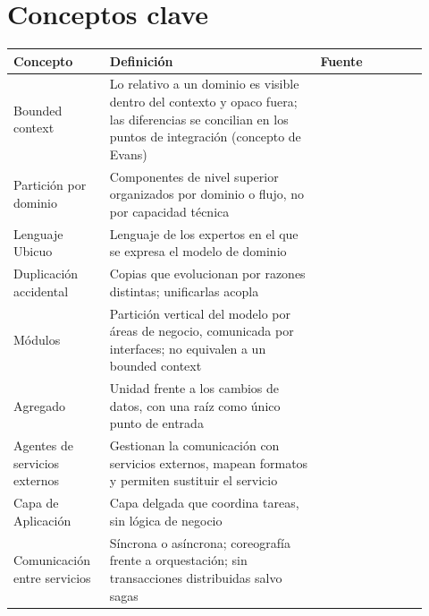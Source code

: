 \section{Conceptos clave}

\begin{table}[htbp]
  \centering
  \footnotesize
  \renewcommand{\arraystretch}{1.2}
  \begin{tabular}{@{}p{0.21\linewidth}p{0.47\linewidth}p{0.24\linewidth}@{}}
    \toprule
    \textbf{Concepto} & \textbf{Definición} & \textbf{Fuente} \\
    \midrule
    \raggedright Bounded context
      & \raggedright Lo relativo a un dominio es visible dentro del contexto y opaco fuera; las
        diferencias se concilian en los puntos de integración (concepto de Evans)
      & \raggedright \textcite[cap.~7]{richardsford2020} \tabularnewline
    \raggedright Partición por dominio
      & \raggedright Componentes de nivel superior organizados por dominio o flujo, no por capacidad
        técnica
      & \raggedright \textcite[cap.~8]{richardsford2020} \tabularnewline
    \raggedright Lenguaje Ubicuo
      & \raggedright Lenguaje de los expertos en el que se expresa el modelo de dominio
      & \raggedright \textcite[21, 42, 72]{delatorre2010} \tabularnewline
    \raggedright Duplicación accidental
      & \raggedright Copias que evolucionan por razones distintas; unificarlas acopla
      & \raggedright \textcite[154--155]{martin2017} \tabularnewline
    \raggedright Módulos
      & \raggedright Partición vertical del modelo por áreas de negocio, comunicada por interfaces; no
        equivalen a un bounded context
      & \raggedright \textcite[71--72]{delatorre2010} \tabularnewline
    \raggedright Agregado
      & \raggedright Unidad frente a los cambios de datos, con una raíz como único punto de entrada
      & \raggedright \textcite[172--174]{delatorre2010} \tabularnewline
    \raggedright Agentes de servicios externos
      & \raggedright Gestionan la comunicación con servicios externos, mapean formatos y permiten
        sustituir el servicio
      & \raggedright \textcite[58, 108, 155--156]{delatorre2010} \tabularnewline
    \raggedright Capa de Aplicación
      & \raggedright Capa delgada que coordina tareas, sin lógica de negocio
      & \raggedright \textcite[247]{delatorre2010} \tabularnewline
    \raggedright Comunicación entre servicios
      & \raggedright Síncrona o asíncrona; coreografía frente a orquestación; sin transacciones
        distribuidas salvo sagas
      & \raggedright \textcite[caps.~14 y 17]{richardsford2020} \tabularnewline

\end{tabular}
\end{table}
